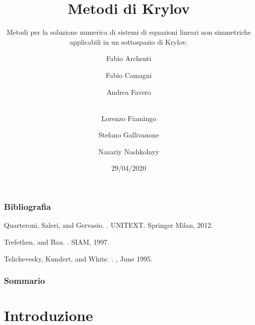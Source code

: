 \documentclass[10pt]{beamer}
\begin{document}
\begin{frame}
  \title{Metodi di Krylov}
  \subtitle{Metodi per la soluzione numerica di sistemi di equazioni lineari non simmetriche applicabili in un sottospazio di Krylov.}
  \date{29/04/2020}
  \author[Principal]{Fabio Archenti \and Fabio Camagni \and Andrea Favero \and  \\Lorenzo Fiamingo \and Stefano Gallivanone \and Nazariy Nashkolnyy}
  \maketitle
\end{frame}

\begin{frame}
    \frametitle{Bibliografia}
    
  \begin{thebibliography}{99}\small
    Quarteroni, Saleri, and Gervasio.
    .
    \newblock UNITEXT. Springer Milan, 2012.

    Trefethen, and Bau.
    .
    \newblock SIAM, 1997.
    
   
   Telichevesky, Kundert, and White.
   .
   , June 1995.

   \end{thebibliography}

  
\end{frame}  

\begin{frame}
  \frametitle{Sommario}
  \tableofcontents
\end{frame}

\section{Introduzione}\label{sec:sec1}

\end{document}

